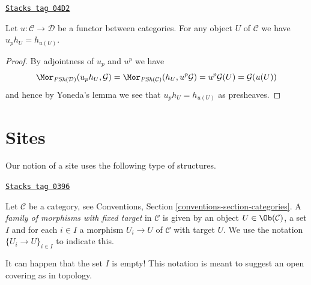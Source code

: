 \begin{lemma}
\label{sites-lemma-pullback-representable-presheaf}
\href{https://stacks.math.columbia.edu/tag/04D2}{\texttt{Stacks tag 04D2}}

Let $u : \mathcal{C} \to \mathcal{D}$ be a functor between categories.
For any object $U$ of $\mathcal{C}$ we have $u_ph_U = h_{u(U)}$.
\end{lemma}

\begin{proof}
By adjointness of $u_p$ and $u^p$ we have
$$
\Mor_{\textit{PSh}(\mathcal{D})}(u_ph_U, \mathcal{G})
=
\Mor_{\textit{PSh}(\mathcal{C})}(h_U, u^p\mathcal{G})
=
u^p\mathcal{G}(U) =
\mathcal{G}(u(U))
$$
and hence by Yoneda's lemma we see that $u_ph_U = h_{u(U)}$ as
presheaves.
\end{proof}

\section{Sites}
\label{sites-section-sites-definitions}
Our notion of a site uses the following type of structures.

\begin{definition}
\label{sites-definition-family-morphisms-fixed-target}
\href{https://stacks.math.columbia.edu/tag/0396}{\texttt{Stacks tag 0396}}

Let $\mathcal{C}$ be a category, see
Conventions, Section \ref{conventions-section-categories}.
A {\it family of morphisms with fixed target} in $\mathcal{C}$ is
given by an object $U \in \Ob(\mathcal{C})$, a set $I$ and
for each $i\in I$ a morphism $U_i \to U$ of $\mathcal{C}$ with target $U$.
We use the notation $\{U_i \to U\}_{i\in I}$ to indicate this.
\end{definition}

It can happen that the set $I$ is empty! This
notation is meant to suggest an open covering as in topology.

